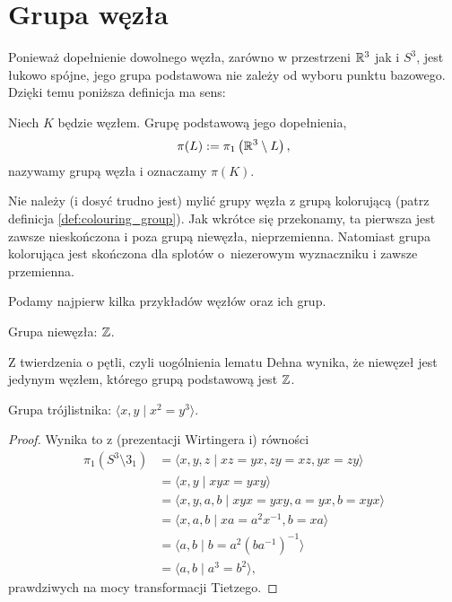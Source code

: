 
\section{Grupa węzła}
Ponieważ dopełnienie dowolnego węzła, zarówno w przestrzeni $\mathbb R^3$ jak i $S^3$, jest łukowo spójne, jego grupa podstawowa nie zależy od wyboru punktu bazowego.
Dzięki temu poniższa definicja ma sens:

\begin{definition}
%
    Niech $K$ będzie węzłem.
    Grupę podstawową jego dopełnienia,
    \begin{equation}
        \pi(L) := \pi_1 \left(\mathbb R^3 \setminus L\right),
    \end{equation}
    nazywamy grupą węzła i oznaczamy $\pi(K)$.
\end{definition}

Nie należy (i dosyć trudno jest) mylić grupy węzła z grupą kolorującą (patrz definicja \ref{def:colouring_group}).
Jak wkrótce się przekonamy, ta pierwsza jest zawsze nieskończona i poza grupą niewęzła, nieprzemienna.
Natomiast grupa kolorująca jest skończona dla splotów o~niezerowym wyznaczniku i zawsze przemienna.

Podamy najpierw kilka przykładów węzłów oraz ich grup.

\begin{example}
    Grupa niewęzła: $\mathbb Z$.
\end{example}

Z twierdzenia o pętli, czyli uogólnienia lematu Dehna wynika, że niewęzeł jest jedynym węzłem, którego grupą podstawową jest $\mathbb Z$.

\begin{example}
\label{exm:trefoil_group}%
    Grupa trójlistnika: $\langle x, y \mid x^2 = y^3\rangle$.
\end{example}

\begin{proof}
    Wynika to z (prezentacji Wirtingera i) równości
    \begin{align}
        \pi_1(S^3 \setminus 3_1) & = \langle x, y, z \mid xz = yx, zy = xz, yx = zy \rangle \\
                                 & = \langle x, y \mid xyx = yxy \rangle \\
                                 & = \langle x, y, a, b \mid xyx = yxy, a = yx, b = xyx \rangle \\
                                 & = \langle x, a, b \mid xa = a^2x^{-1}, b = xa \rangle \\
                                 & = \langle a, b \mid b = a^2(ba^{-1})^{-1} \rangle \\
                                 & = \langle a, b \mid a^3 = b^2 \rangle,
    \end{align}
    prawdziwych na mocy transformacji Tietzego.
\end{proof}

